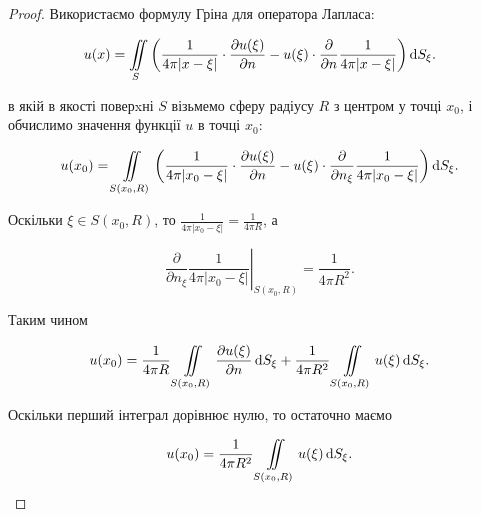 \begin{proof}
	Використаємо формулу Гріна для оператора Лапласа:

	\begin{equation}
		u(x) = \displaystyle\iint\limits_S \left( \frac{1}{4 \pi |x - \xi|} \cdot \frac{\partial u(\xi)}{\partial n} - u(\xi) \cdot \frac{\partial}{\partial n} \frac{1}{4 \pi |x - \xi|} \right) \mathop{}\!\mathrm{d} S_\xi.
	\end{equation}

	в якій в якості поверxні $S$ візьмемо сферу радіусу $R$ з центром у точці $x_0$, і обчислимо значення функції $u$ в точці $x_0$:

	\begin{equation}
		u(x_0) = \displaystyle\iint\limits_{S(x_0, R)} \left( \frac{1}{4 \pi |x_0 - \xi|} \cdot \frac{\partial u(\xi)}{\partial n} - u(\xi) \cdot \frac{\partial}{\partial n_\xi} \frac{1}{4 \pi |x_0 - \xi|} \right) \mathop{}\!\mathrm{d} S_\xi.
	\end{equation}
	 
	Оскільки $\xi \in S(x_0, R)$, то $\frac{1}{4 \pi |x_0 - \xi|} = \frac{1}{4 \pi R}$, а

	\begin{equation}
		\left. \frac{\partial}{\partial n_\xi} \frac{1}{4 \pi |x_0 - \xi|} \right|_{S(x_0, R)} = \frac{1}{4 \pi R^2}.
	\end{equation}

	Таким чином 

	\begin{equation}
		u(x_0) = \frac{1}{4 \pi R} \displaystyle\iint\limits_{S(x_0, R)} \frac{\partial u(\xi)}{\partial n} \mathop{}\!\mathrm{d} S_\xi + \frac{1}{4 \pi R^2} \displaystyle\iint\limits_{S(x_0, R)} u(\xi) \mathop{}\!\mathrm{d} S_\xi.
	\end{equation}

	Оскільки перший інтеграл дорівнює нулю, то остаточно маємо

	\begin{equation}
		u(x_0) = \frac{1}{4 \pi R^2} \displaystyle\iint\limits_{S(x_0, R)} u(\xi) \mathop{}\!\mathrm{d} S_\xi .
	\end{equation}
\end{proof}